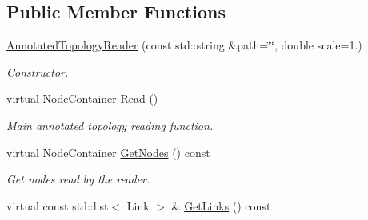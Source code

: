 \subsection*{Public Member Functions}
\begin{DoxyCompactItemize}
\item 
\hyperlink{classns3_1_1AnnotatedTopologyReader_a5799ffbffba82cb65d091482539b86d4}{Annotated\+Topology\+Reader} (const std\+::string \&path=\char`\"{}\char`\"{}, double scale=1.)
\begin{DoxyCompactList}\small\item\em Constructor. \end{DoxyCompactList}\item 
virtual Node\+Container \hyperlink{classns3_1_1AnnotatedTopologyReader_a6284f11d2dce1e96c66b05082edeb444}{Read} ()
\begin{DoxyCompactList}\small\item\em Main annotated topology reading function. \end{DoxyCompactList}\item 
virtual Node\+Container \hyperlink{classns3_1_1AnnotatedTopologyReader_a9e01e253a256cdc53aecf58365c2f6f3}{Get\+Nodes} () const\hypertarget{classns3_1_1AnnotatedTopologyReader_a9e01e253a256cdc53aecf58365c2f6f3}{}\label{classns3_1_1AnnotatedTopologyReader_a9e01e253a256cdc53aecf58365c2f6f3}

\begin{DoxyCompactList}\small\item\em Get nodes read by the reader. \end{DoxyCompactList}\item 
virtual const std\+::list$<$ Link $>$ \& \hyperlink{classns3_1_1AnnotatedTopologyReader_a691dffec8620808df8b3c36a0b43a160}{Get\+Links} () const\hypertarget{classns3_1_1AnnotatedTopologyReader_a691dffec8620808df8b3c36a0b43a160}{}\label{classns3_1_1AnnotatedTopologyReader_a691dffec8620808df8b3c36a0b43a160}


\end{DoxyCompactItemize}
